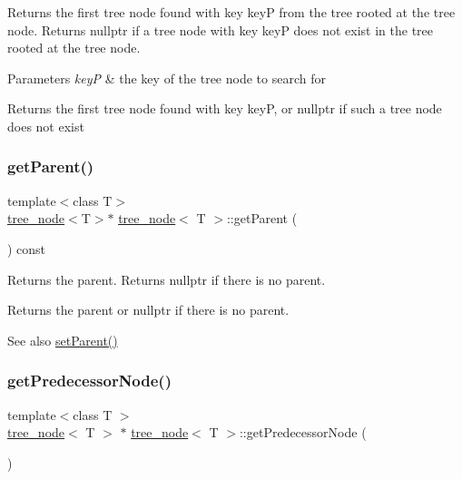 Returns the first tree node found with key keyP from the tree rooted at the tree node. Returns nullptr if a tree node with key keyP does not exist in the tree rooted at the tree node. 
\begin{DoxyParams}{Parameters}
{\em keyP} & the key of the tree node to search for \\
\hline
\end{DoxyParams}
\begin{DoxyReturn}{Returns}
the first tree node found with key keyP, or nullptr if such a tree node does not exist 
\end{DoxyReturn}
\mbox{\label{classtree__node_aa17e609b57f77bb5446d83c964409ac4}} 
\subsubsection{\texorpdfstring{get\+Parent()}{getParent()}}
{\footnotesize\ttfamily template$<$class T$>$ \\
\hyperlink{classtree__node}{tree\+\_\+node}$<$T$>$$\ast$ \hyperlink{classtree__node}{tree\+\_\+node}$<$ T $>$\+::get\+Parent (\begin{DoxyParamCaption}{ }\end{DoxyParamCaption}) const\hspace{0.3cm}{\ttfamily [inline]}}

Returns the parent. Returns nullptr if there is no parent. \begin{DoxyReturn}{Returns}
the parent or nullptr if there is no parent. 
\end{DoxyReturn}
\begin{DoxySeeAlso}{See also}
\hyperlink{classtree__node_a1fe75baae3a5d9caa9cb886c54c291e2}{set\+Parent()} 
\end{DoxySeeAlso}
\mbox{\label{classtree__node_a5cce6c37b00a6d899e371c334559310e}} 
\subsubsection{\texorpdfstring{get\+Predecessor\+Node()}{getPredecessorNode()}}
{\footnotesize\ttfamily template$<$class T $>$ \\
\hyperlink{classtree__node}{tree\+\_\+node}$<$ T $>$ $\ast$ \hyperlink{classtree__node}{tree\+\_\+node}$<$ T $>$\+::get\+Predecessor\+Node (\begin{DoxyParamCaption}{ }\end{DoxyParamCaption})}

